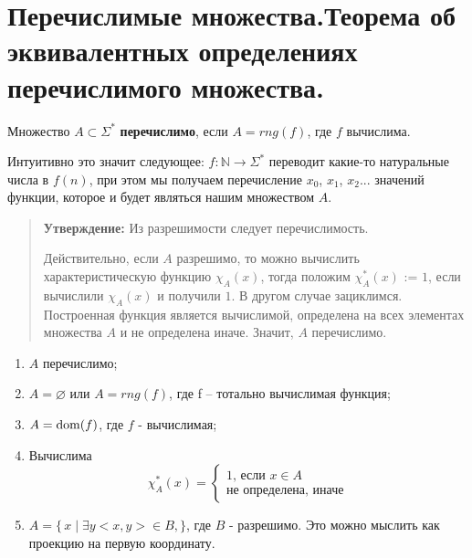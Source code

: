 \section{Перечислимые множества.Теорема об эквивалентных определениях перечислимого множества.}
\begin{definition} Множество $A \subset \Sigma^*$ \textbf{перечислимо}, если $A=rng(f)$, где $f$ вычислима.
\end{definition}
Интуитивно это значит следующее: $f: \mathbb{N} \to \Sigma^*$ переводит какие-то натуральные числа в $f(n)$, при
этом мы получаем перечисление $x_{0}$, $x_{1}$, $x_{2}$... значений функции, которое и будет являться нашим
множеством $A$.

\begin{quote} {\textbf{Утверждение: }}
	Из разрешимости следует перечислимость.
	\par Действительно, если $A$ разрешимо, то можно вычислить характеристическую функцию $\chi_{A}(x)$, тогда положим
	$\chi^*_{A}(x)$ := $1$, если вычислили  $\chi_{A}(x)$ и получили $1$. В другом случае зациклимся. Построенная
	функция является вычислимой, определена на всех элементах множества $A$ и не определена иначе. Значит, $A$
	перечислимо.
\end{quote}
\begin{theorem}
	\begin{enumerate}
		\item $A$ перечислимо;
		\item $A = \varnothing $ или $A = rng(f)$, где f -- тотально вычислимая функция;
		\item $A = \operatorname{dom}(f)$, где $f$ - вычислимая;
		\item Вычислима
			\begin{equation*}
				\chi^*_{A}(x) = 
				\begin{cases}
					\text{1, если $x \in A$}\\
					\text{не определена, иначе}
				\end{cases}
			\end{equation*}
		\item $A = \{\,x\mid\exists y <x,y> \in B,\}$, где $B$ - разрешимо. Это можно мыслить как проекцию на
			первую координату.
	\end{enumerate}
\end{theorem}
